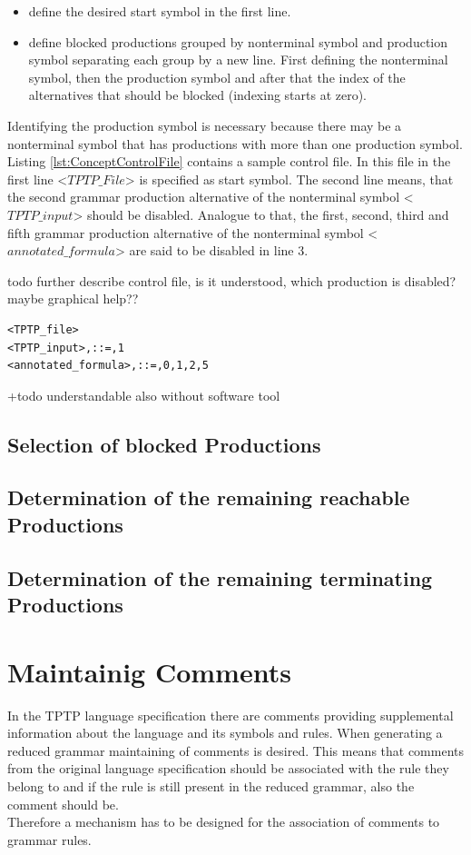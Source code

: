 \begin{itemize}%
	\item define the desired start symbol in the first line.
	\item define blocked productions grouped by nonterminal symbol and production symbol separating each group by a new line.
	First defining the nonterminal symbol, then the production symbol and after that the index of the alternatives that should be blocked (indexing starts at zero). 
\end{itemize}
\label{itemize:ConceptControlFile}
Identifying the production symbol is necessary because there may be a nonterminal symbol that has productions with more than one production symbol.\\
Listing \ref{lst:ConceptControlFile} contains a sample control file. In this file in the first line <$TPTP\_File$> is specified as start symbol.
The second line means, that the second grammar production alternative of the nonterminal symbol <$TPTP\_input$> should be disabled.
Analogue to that, the first, second, third and fifth grammar production alternative of the nonterminal symbol <$annotated\_formula$> are said to be disabled in line 3.

todo further describe control file, is it understood, which production is disabled? maybe graphical help??
\begin{lstlisting}[caption= Example of a control file,label= lst:ConceptControlFile]
<TPTP_file>
<TPTP_input>,::=,1
<annotated_formula>,::=,0,1,2,5
\end{lstlisting}

+todo understandable also without software tool
\subsection{Selection of blocked Productions}

\subsection{Determination of the remaining reachable Productions}

\subsection{Determination of the remaining terminating Productions}

\section{Maintainig Comments}\label{sec:ConceptMaintainingComments}
In the \ac{TPTP} language specification there are comments providing supplemental information about the language and its symbols and rules.
When generating a reduced grammar maintaining of comments is desired. This means that comments from the original language specification should be associated with the rule they belong to and if the rule is still present in the reduced grammar, also the comment should be.\\
Therefore a mechanism has to be designed for the association of comments to grammar rules.

